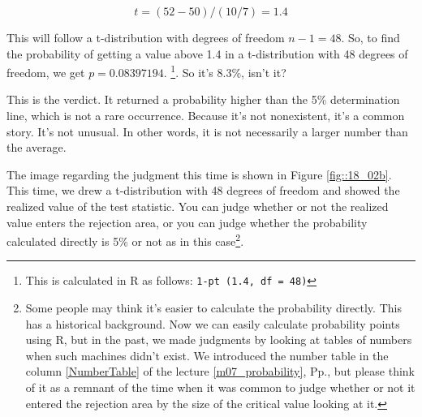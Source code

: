 \documentclass{ltjsbook}
\begin{document}
\[ t = (52-50)/(10/7) = 1.4 \]

This will follow a t-distribution with degrees of freedom $n-1=48$. So, to find the probability of getting a value above 1.4 in a t-distribution with 48 degrees of freedom, we get $p=0.08397194$. \footnote {This is calculated in R as follows: \texttt {1-pt (1.4, df = 48)}}. So it's 8.3\%, isn't it?

This is the verdict. It returned a probability higher than the 5\% determination line, which is not a rare occurrence. Because it's not nonexistent, it's a common story. It's not unusual. In other words, it is not necessarily a larger number than the average.

The image regarding the judgment this time is shown in Figure \ref{fig::18_02b}. This time, we drew a t-distribution with 48 degrees of freedom and showed the realized value of the test statistic. You can judge whether or not the realized value enters the rejection area, or you can judge whether the probability calculated directly is 5\% or not as in this case\footnote{Some people may think it's easier to calculate the probability directly. This has a historical background. Now we can easily calculate probability points using R, but in the past, we made judgments by looking at tables of numbers when such machines didn't exist. We introduced the number table in the column \ref{NumberTable} of the lecture \ref{m07_probability}, Pp.\pageref{NumberTable}, but please think of it as a remnant of the time when it was common to judge whether or not it entered the rejection area by the size of the critical value looking at it.}.
\end{document}

